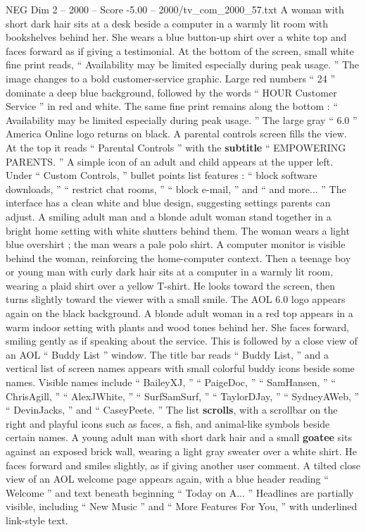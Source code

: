 \begin{textsample}{NEG Dim 2 – 2000 – Score -5.00 – 2000/tv\_com\_2000\_57.txt}
A woman with short dark hair sits at a desk beside a computer in a warmly lit room with bookshelves behind her.
She wears a blue button-up shirt over a white top and faces forward as if giving a testimonial.
At the bottom of the screen, small white fine print reads, “ Availability may be limited especially during peak usage. ” The image changes to a bold customer-service graphic.
Large red numbers “ 24 ” dominate a deep blue background, followed by the words “ HOUR Customer Service ” in red and white.
The same fine print remains along the bottom : “ Availability may be limited especially during peak usage. ” The large gray “ 6.0 ” America Online logo returns on black.
A parental controls screen fills the view.
At the top it reads “ Parental Controls ” with the \textbf{subtitle} “ EMPOWERING PARENTS. ” A simple icon of an adult and child appears at the upper left.
Under “ Custom Controls, ” bullet points list features : “ block software downloads, ” “ restrict chat rooms, ” “ block e-mail, ” and “ and more... ” The interface has a clean white and blue design, suggesting settings parents can adjust.
A smiling adult man and a blonde adult woman stand together in a bright home setting with white shutters behind them.
The woman wears a light blue overshirt ; the man wears a pale polo shirt.
A computer monitor is visible behind the woman, reinforcing the home-computer context.
Then a teenage boy or young man with curly dark hair sits at a computer in a warmly lit room, wearing a plaid shirt over a yellow T-shirt.
He looks toward the screen, then turns slightly toward the viewer with a small smile.
The AOL 6.0 logo appears again on the black background.
A blonde adult woman in a red top appears in a warm indoor setting with plants and wood tones behind her.
She faces forward, smiling gently as if speaking about the service.
This is followed by a close view of an AOL “ Buddy List ” window.
The title bar reads “ Buddy List, ” and a vertical list of screen names appears with small colorful buddy icons beside some names.
Visible names include “ BaileyXJ, ” “ PaigeDoc, ” “ SamHansen, ” “ ChrisAgill, ” “ AlexJWhite, ” “ SurfSamSurf, ” “ TaylorDJay, ” “ SydneyAWeb, ” “ DevinJacks, ” and “ CaseyPeete. ” The list \textbf{scrolls}, with a scrollbar on the right and playful icons such as faces, a fish, and animal-like symbols beside certain names.
A young adult man with short dark hair and a small \textbf{goatee} sits against an exposed brick wall, wearing a light gray sweater over a white shirt.
He faces forward and smiles slightly, as if giving another user comment.
A tilted close view of an AOL welcome page appears again, with a blue header reading “ Welcome ” and text beneath beginning “ Today on A... ” Headlines are partially visible, including “ New Music ” and “ More Features For You, ” with underlined link-style text.

\end{textsample}
